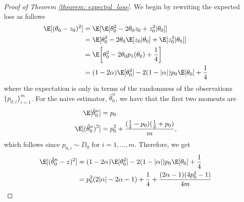 \begin{proof}[Proof of Theorem \ref{theorem: expected_loss}]
We begin by rewriting the expected loss as follows 
\begin{align*}
\E[(\theta_0 - z_0)^2] &= \E[\E[\theta_0^2 - 2\theta_0 z_0 + z_0^2 | \theta_0]]\\
&= \E[\theta_0^2 - 2 \theta_0 \E[z_0 | \theta_0] + \E[z_0^2 | \theta_0]]\\
&= \E\bigg[\theta_0^2 - 2 \theta_0 p_1(\theta_0) + \frac14\bigg]\\
&=(1-2\alpha)\E[\theta_0^2] - 2 (1 - |\alpha|)p_0 \E[\theta_0] + \frac14
\end{align*}
where the expectation is only in terms of the randomness of the observations $\{p_{0, i} \}_{i=1}^m$.
For the naive estimator, $\hat{\theta}_0^n$, we have that the first two moments are 
\begin{align*}
\E[\hat{\theta}_0^n] & = p_0\\
\E[(\hat{\theta}_0^n)^2] &= p_0^2 + \frac{(\frac12 - p_0)(\frac12 + p_0)}{m},
\end{align*} 
which follows since $p_{0,i} \sim D_0$ for $i = 1, \dots, m$. Therefore, we get
\begin{align*}
\E[(\hat{\theta}_0^n - z)^2] &=  
(1-2\alpha)\E[\theta_0^2] - 2 (1 - |\alpha|)p_0 \E[\theta_0] + \frac14\\
&= p_0^2 (2 |\alpha| - 2\alpha - 1) + \frac14 + \frac{(2\alpha - 1)(4 p_0^2 - 1)}{4m}
\end{align*}


\end{proof}
